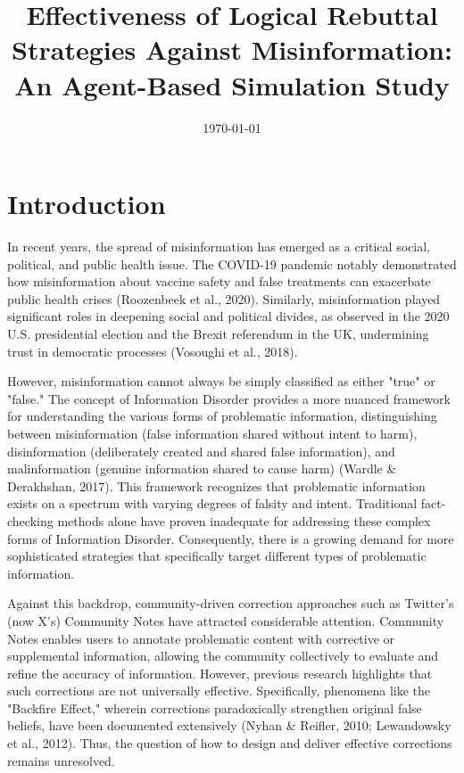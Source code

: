 \documentclass[twocolumn]{article}
\title{Effectiveness of Logical Rebuttal Strategies Against Misinformation: An Agent-Based Simulation Study}
\author{}
\date{\today}
\begin{document}
\maketitle

\section{Introduction}
In recent years, the spread of misinformation has emerged as a critical social, political, and public health issue. The COVID-19 pandemic notably demonstrated how misinformation about vaccine safety and false treatments can exacerbate public health crises (Roozenbeek et al., 2020). Similarly, misinformation played significant roles in deepening social and political divides, as observed in the 2020 U.S. presidential election and the Brexit referendum in the UK, undermining trust in democratic processes (Vosoughi et al., 2018).

However, misinformation cannot always be simply classified as either "true" or "false." The concept of Information Disorder provides a more nuanced framework for understanding the various forms of problematic information, distinguishing between misinformation (false information shared without intent to harm), disinformation (deliberately created and shared false information), and malinformation (genuine information shared to cause harm) (Wardle \& Derakhshan, 2017). This framework recognizes that problematic information exists on a spectrum with varying degrees of falsity and intent. Traditional fact-checking methods alone have proven inadequate for addressing these complex forms of Information Disorder. Consequently, there is a growing demand for more sophisticated strategies that specifically target different types of problematic information.

Against this backdrop, community-driven correction approaches such as Twitter's (now X's) Community Notes have attracted considerable attention. Community Notes enables users to annotate problematic content with corrective or supplemental information, allowing the community collectively to evaluate and refine the accuracy of information. However, previous research highlights that such corrections are not universally effective. Specifically, phenomena like the "Backfire Effect," wherein corrections paradoxically strengthen original false beliefs, have been documented extensively (Nyhan \& Reifler, 2010; Lewandowsky et al., 2012). Thus, the question of how to design and deliver effective corrections remains unresolved.
\end{document}
